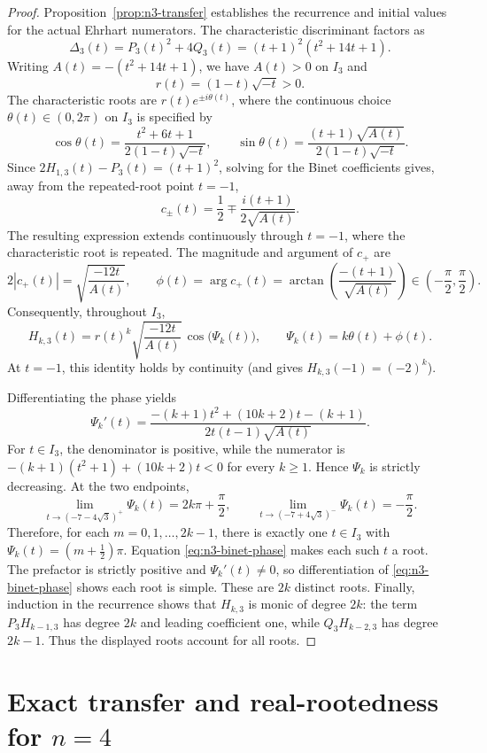 \documentclass[11pt,a4paper]{article}
\theoremstyle{definition}
\begin{document}
\begin{proof}
Proposition~\ref{prop:n3-transfer} establishes the recurrence and initial
values for the actual Ehrhart numerators. The characteristic
discriminant factors as
\[
\Delta_3(t)=P_3(t)^2+4Q_3(t)
=(t+1)^2(t^2+14t+1).
\]
Writing $A(t)=-(t^2+14t+1)$, we have $A(t)>0$ on $I_3$ and
\[
r(t)=(1-t)\sqrt{-t}>0.
\]
The characteristic roots are $r(t)e^{\pm i\theta(t)}$, where the
continuous choice $\theta(t)\in(0,2\pi)$ on $I_3$ is specified by
\[
\cos\theta(t)=\frac{t^2+6t+1}{2(1-t)\sqrt{-t}},\qquad
\sin\theta(t)=\frac{(t+1)\sqrt{A(t)}}{2(1-t)\sqrt{-t}}.
\]
Since $2H_{1,3}(t)-P_3(t)=(t+1)^2$, solving for the Binet coefficients
gives, away from the repeated-root point $t=-1$,
\[
c_\pm(t)=\frac12\mp\frac{i(t+1)}{2\sqrt{A(t)}}.
\]
The resulting expression extends continuously through $t=-1$, where
the characteristic root is repeated. The magnitude and argument of
$c_+$ are
\[
2|c_+(t)|=\sqrt{\frac{-12t}{A(t)}},\qquad
\phi(t)=\arg c_+(t)
=\arctan\!\left(\frac{-(t+1)}{\sqrt{A(t)}}\right)
\in\left(-\frac\pi2,\frac\pi2\right).
\]
Consequently, throughout $I_3$,
\begin{equation}\label{eq:n3-binet-phase}
H_{k,3}(t)=r(t)^k
\sqrt{\frac{-12t}{A(t)}}\,
\cos\bigl(\Psi_k(t)\bigr),
\qquad \Psi_k(t)=k\theta(t)+\phi(t).
\end{equation}
At $t=-1$, this identity holds by continuity (and gives
$H_{k,3}(-1)=(-2)^k$).

Differentiating the phase yields
\[
\Psi_k'(t)=
\frac{-(k+1)t^2+(10k+2)t-(k+1)}
{2t(t-1)\sqrt{A(t)}}.
\]
For $t\in I_3$, the denominator is positive, while the numerator is
$-(k+1)(t^2+1)+(10k+2)t<0$ for every $k\ge1$. Hence $\Psi_k$ is
strictly decreasing. At the two endpoints,
\[
\lim_{t\to(-7-4\sqrt3)^+}\Psi_k(t)
=2k\pi+\frac\pi2,\qquad
\lim_{t\to(-7+4\sqrt3)^-}\Psi_k(t)=-\frac\pi2.
\]
Therefore, for each $m=0,1,\ldots,2k-1$, there is exactly one
$t\in I_3$ with $\Psi_k(t)=(m+\tfrac12)\pi$. Equation
\eqref{eq:n3-binet-phase} makes each such $t$ a root. The prefactor is
strictly positive and $\Psi_k'(t)\ne0$, so differentiation of
\eqref{eq:n3-binet-phase} shows each root is simple. These are $2k$
distinct roots. Finally, induction in the recurrence shows that
$H_{k,3}$ is monic of degree $2k$: the term $P_3H_{k-1,3}$ has degree
$2k$ and leading coefficient one, while $Q_3H_{k-2,3}$ has degree
$2k-1$. Thus the displayed roots account for all roots.
\end{proof}

\section{Exact transfer and real-rootedness for $n=4$}
\label{sec:n4-exact}
\end{document}
